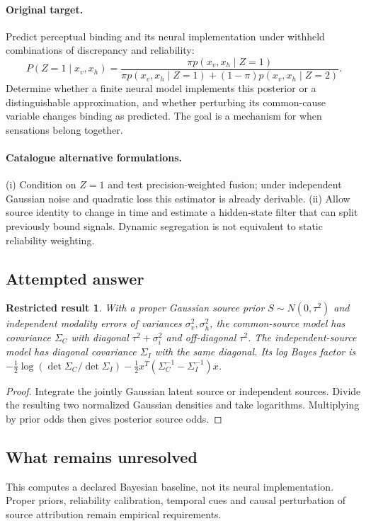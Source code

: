 \documentclass[11pt]{article}
\newtheorem{attemptresult}{Restricted result}[section]
\begin{document}
\paragraph{Original target.}
Predict perceptual binding and its neural implementation under withheld combinations of discrepancy and reliability:
\[
P(Z=1\mid x_v,x_h)=\frac{\pi p(x_v,x_h\mid Z=1)}{\pi p(x_v,x_h\mid Z=1)+(1-\pi)p(x_v,x_h\mid Z=2)}.
\]
Determine whether a finite neural model implements this posterior or a distinguishable approximation, and whether perturbing its common-cause variable changes binding as predicted. The goal is a mechanism for when sensations belong together.
\paragraph{Catalogue alternative formulations.}
(i) Condition on $Z=1$ and test precision-weighted fusion; under independent Gaussian noise and quadratic loss this estimator is already derivable. (ii) Allow source identity to change in time and estimate a hidden-state filter that can split previously bound signals. Dynamic segregation is not equivalent to static reliability weighting.
\subsection{Attempted answer}
\begin{attemptresult}
With a proper Gaussian source prior $S\sim N(0,\tau^2)$ and independent modality errors of variances $\sigma_v^2,\sigma_h^2$, the common-source model has covariance $\Sigma_C$ with diagonal $\tau^2+\sigma_i^2$ and off-diagonal $\tau^2$. The independent-source model has diagonal covariance $\Sigma_I$ with the same diagonal. Its log Bayes factor is $-\tfrac12\log(\det\Sigma_C/\det\Sigma_I)-\tfrac12x^T(\Sigma_C^{-1}-\Sigma_I^{-1})x$.
\end{attemptresult}
\begin{proof}
Integrate the jointly Gaussian latent source or independent sources. Divide the resulting two normalized Gaussian densities and take logarithms. Multiplying by prior odds then gives posterior source odds.
\end{proof}
\subsection{What remains unresolved}
This computes a declared Bayesian baseline, not its neural implementation. Proper priors, reliability calibration, temporal cues and causal perturbation of source attribution remain empirical requirements.
\end{document}
